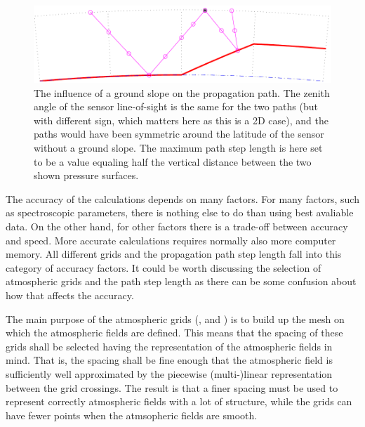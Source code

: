 \begin{figure}[!p]
 \begin{center}
  \includegraphics*[width=0.95\hsize]{Figs/fm_definitions/ppath_ground}
  \caption{The influence of a ground slope on the propagation path. The zenith
    angle of the sensor line-of-sight is the same for the two paths (but with
    different sign, which matters here as this is a 2D case), and the paths
    would have been symmetric around the latitude of the sensor without a 
    ground slope. The maximum path step length is here set to be a value
    equaling half the vertical distance between the two shown pressure
    surfaces.}
  \label{fig:fm_defs:ppath_ground}
 \end{center}
\end{figure}



\label{sec:fm_defs:accuracy}

The accuracy of the calculations depends on many factors. For many
factors, such as spectroscopic parameters, there is nothing else to do
than using best avaliable data. On the other hand, for other factors
there is a trade-off between accuracy and speed. More accurate
calculations requires normally also more computer memory. All
different grids and the propagation path step length fall into this
category of accuracy factors. It could be worth discussing the
selection of atmospheric grids and the path step length as there can
be some confusion about how that affects the accuracy.

The main purpose of the atmospheric grids (,
 and ) is to build up the
mesh on which the atmospheric fields are defined. This means that the
spacing of these grids shall be selected having the representation of
the atmospheric fields in mind. That is, the spacing shall be fine
enough that the atmospheric field is sufficiently well approximated by
the piecewise (multi-)linear representation between the grid
crossings. The result is that a finer spacing must be used to
represent correctly atmospheric fields with a lot of structure, while
the grids can have fewer points when the atmsopheric fields are
smooth. 

